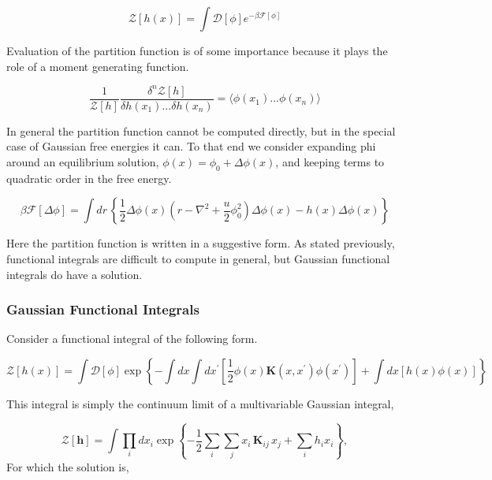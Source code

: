 \documentclass[11pt]{article}
\newcommand{\F}{\mathcal{F}}
\newcommand{\f}{\frac}
\newcommand{\Z}{\mathcal{Z}}
\newcommand{\D}{\mathcal{D}}
\begin{document}
\begin{equation}
\mathcal{Z}[h(x)] = \int \mathcal{D}[\phi] e^{-\beta\F[\phi]}
\end{equation}

Evaluation of the partition function is of some importance because it plays the role of a moment generating function. 

\begin{equation}\label{gen}
\f{1}{\Z[h]}\f{\delta^n \Z[h]}{\delta h(x_1)...\delta h(x_n)} = \langle \phi(x_1)...\phi(x_n)\rangle
\end{equation}

In general the partition function cannot be computed directly, but in the special case of Gaussian free energies it can. To that end we consider expanding phi around an equilibrium solution, $\phi(x) = \phi_0 + \Delta\phi(x)$, and keeping terms to quadratic order in the free energy.

\begin{equation}
\beta\F[\Delta\phi] = \int dr \,\left\lbrace \f{1}{2}\Delta\phi(x) \left(r - \nabla^2 + \f{u}{2}\phi_0^2\right) \Delta\phi(x) - h(x)\Delta\phi(x) \right\rbrace
\end{equation}

Here the partition function is written in a suggestive form. As stated previously, functional integrals are difficult to compute in general, but Gaussian functional integrals do have a solution. 

\subsubsection{Gaussian Functional Integrals}

Consider a functional integral of the following form. 

\begin{equation}
\Z[h(x)] = \int \D[\phi] \exp\left\lbrace - \int dx \int dx^\prime \left[ \f{1}{2}\phi(x) \mathbf{K}(x, x^\prime) \phi(x^\prime)\right] +  \int dx \left[h(x) \phi(x)\right]\right\rbrace
\end{equation}

This integral is simply the continuum limit of a multivariable Gaussian integral, 

\begin{equation}
\Z[\mathbf{h}] = \int \prod_i dx_i \exp \left\lbrace - \f{1}{2}\sum_i \sum_j x_i\, \mathbf{K}_{ij}\, x_j  + \sum_i h_i x_i\right\rbrace,
\end{equation}
For which the solution is, 
\end{document}
